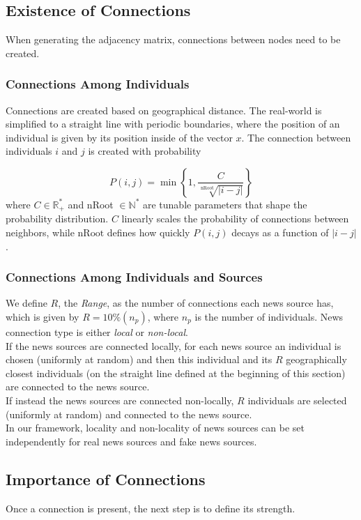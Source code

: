 \subsection{Existence of Connections}
\label{subsec:connections_existence}
When generating the adjacency matrix, connections between nodes need to be created.
\subsubsection{Connections Among Individuals}
\label{subsub: connections}
Connections are created based on geographical distance. The real-world is simplified to a straight line with periodic boundaries, where the position of an individual is given by its position inside of the vector $x$. The connection between individuals $i$ and $j$ is created with probability 


$$
P(i,j) = \min\left\lbrace 1,\frac{C}{\sqrt[\text{nRoot}]{\vert i-j\vert}}\right\rbrace
$$
where $C\in \mathbb{R}^*_+$ and nRoot $\in \mathbb{N}^*$ are tunable parameters that shape the probability distribution. $C$ linearly scales the probability of connections between neighbors, while $\text{nRoot}$ defines how quickly $P(i,j)$ decays as a function of $\vert i-j \vert$.

\subsubsection{Connections Among Individuals and Sources}
We define $R$, the \textit{Range}, as the number of connections each news source has, which is given by $R= 10\% (n_p)$, where $n_p$ is the number of individuals.
News connection type is either \textit{local} or \textit{non-local}. 
\\If the news sources are connected locally, for each news source an individual is chosen (uniformly at random) and then this individual and its $R$ geographically closest individuals (on the straight line defined at the beginning of this section) are connected to the news source.
\\If instead the news sources are connected non-locally, $R$ individuals are selected (uniformly at random) and connected to the news source.
\\In our framework, locality and non-locality of news sources can be set independently for real news sources and fake news sources.



\subsection{Importance of Connections}
Once a connection is present, the next step is to define its strength.

